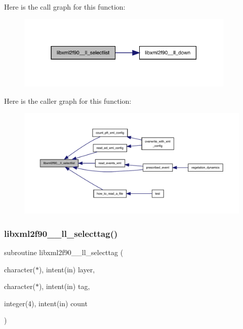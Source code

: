 Here is the call graph for this function\+:
\nopagebreak
\begin{figure}[H]
\begin{center}
\leavevmode
\includegraphics[width=295pt]{libxml2f90_8f90__pp_8f90_aa648c34edeb1a504525200e1aed59f18_cgraph}
\end{center}
\end{figure}
Here is the caller graph for this function\+:
\nopagebreak
\begin{figure}[H]
\begin{center}
\leavevmode
\includegraphics[width=350pt]{libxml2f90_8f90__pp_8f90_aa648c34edeb1a504525200e1aed59f18_icgraph}
\end{center}
\end{figure}
\mbox{\label{libxml2f90_8f90__pp_8f90_a82a4ef1569ea46506f400cf73fce7369}} 
\subsubsection{\texorpdfstring{libxml2f90\+\_\+\+\_\+ll\+\_\+selecttag()}{libxml2f90\_\_ll\_selecttag()}}
{\footnotesize\ttfamily subroutine libxml2f90\+\_\+\+\_\+ll\+\_\+selecttag (\begin{DoxyParamCaption}\item[{character($\ast$), intent(in)}]{layer,  }\item[{character($\ast$), intent(in)}]{tag,  }\item[{integer(4), intent(in)}]{count }\end{DoxyParamCaption})}

